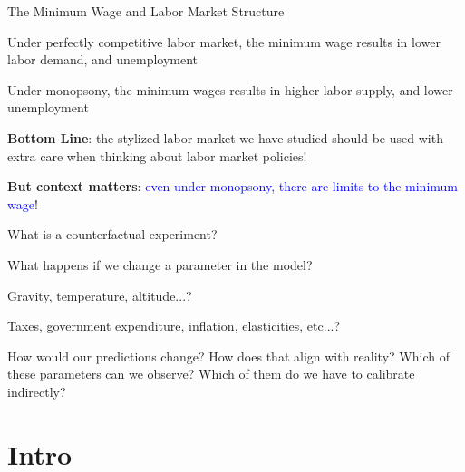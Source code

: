 \documentclass[notes,11pt, aspectratio=169, xcolor=table]{beamer}
\newenvironment{wideitemize}{\itemize\addtolength{\itemsep}{10pt}}{\enditemize}
\begin{document}
  \begin{frame}{The Minimum Wage and Labor Market Structure}

  \begin{wideitemize}
  \item Under perfectly competitive labor market, the minimum wage results in
lower labor demand, and unemployment
    \item  Under monopsony, the minimum wages results in higher labor supply, and lower unemployment
    \item \textbf{Bottom Line}: the stylized labor market we have studied should be used with extra care when thinking about labor market policies!
    \item \textbf{But context matters}: \textcolor{blue}{even under monopsony, there are limits to the minimum wage}!
  \end{wideitemize}

  \end{frame}

\begin{frame}{What is a counterfactual experiment?}
 \begin{wideitemize}
    \item What happens if we change a parameter in the model?
    \item<2-> Gravity, temperature, altitude...?
    \item<3-> Taxes, government expenditure, inflation, elasticities, etc...?
    \item<4-> How would our predictions change? How does that align with reality? Which of these parameters can we observe? Which of them do we have to calibrate indirectly?
 \end{wideitemize}
\end{frame}

\section{Intro}
\end{document}
